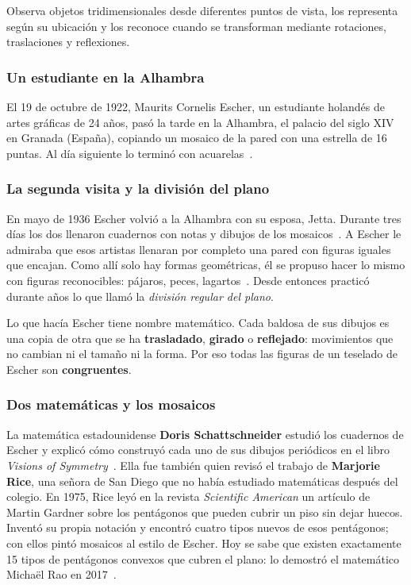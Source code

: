 \documentclass[11pt]{article}
\begin{document}
\begin{dba}
Observa objetos tridimensionales desde diferentes puntos de vista, los representa según su
ubicación y los reconoce cuando se transforman mediante rotaciones, traslaciones y reflexiones.
\end{dba}


\subsubsection*{Un estudiante en la Alhambra}

El 19 de octubre de 1922, Maurits Cornelis Escher, un estudiante holandés de artes gráficas de
24 años, pasó la tarde en la Alhambra, el palacio del siglo XIV en Granada (España), copiando un
mosaico de la pared con una estrella de 16 puntas. Al día siguiente lo terminó con
acuarelas~\cite{museo,aramco}.

\subsubsection*{La segunda visita y la división del plano}

En mayo de 1936 Escher volvió a la Alhambra con su esposa, Jetta. Durante tres días los dos
llenaron cuadernos con notas y dibujos de los mosaicos~\cite{aramco}. A Escher le admiraba que
esos artistas llenaran por completo una pared con figuras iguales que encajan. Como allí solo
hay formas geométricas, él se propuso hacer lo mismo con figuras reconocibles: pájaros, peces,
lagartos~\cite{museo}. Desde entonces practicó durante años lo que llamó la \emph{división regular
del plano}.

Lo que hacía Escher tiene nombre matemático. Cada baldosa de sus dibujos es una copia de otra
que se ha \textbf{trasladado}, \textbf{girado} o \textbf{reflejado}: movimientos que no cambian ni
el tamaño ni la forma. Por eso todas las figuras de un teselado de Escher son
\textbf{congruentes}.

\subsubsection*{Dos matemáticas y los mosaicos}

La matemática estadounidense \textbf{Doris Schattschneider} estudió los cuadernos de Escher y
explicó cómo construyó cada uno de sus dibujos periódicos en el libro \emph{Visions of
Symmetry}~\cite{schattschneider1990}. Ella fue también quien revisó el trabajo de
\textbf{Marjorie Rice}, una señora de San Diego que no había estudiado matemáticas después del
colegio. En 1975, Rice leyó en la revista \emph{Scientific American} un artículo de Martin Gardner
sobre los pentágonos que pueden cubrir un piso sin dejar huecos. Inventó su propia notación y
encontró cuatro tipos nuevos de esos pentágonos; con ellos pintó mosaicos al estilo de Escher.
Hoy se sabe que existen exactamente 15 tipos de pentágonos convexos que cubren el plano: lo
demostró el matemático Michaël Rao en 2017~\cite{quanta,schattschneider2018}.
\end{document}
